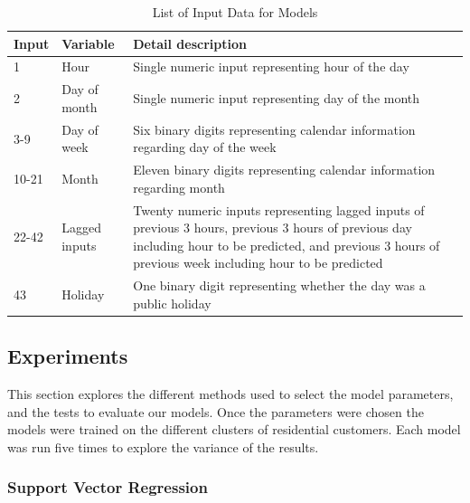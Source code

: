 \begin{table}
	\caption{List of Input Data for Models}
	\label{tab:feature}
	\begin{tabular}{p{1cm}p{1.8cm}p{4.8cm}}
		\toprule
		Input & Variable      & Detail description \\
		\midrule
		1     & Hour          & Single numeric input representing hour of the day                                                                                              \\
		2     & Day of month  & Single numeric input representing day of the month                                                                                             \\
		3-9   & Day of week   & Six binary digits representing calendar information regarding day of the week                                                                                            \\
		10-21 & Month         & Eleven binary digits representing calendar information regarding month                                                                                         \\
		22-42 & Lagged inputs & Twenty numeric inputs representing lagged inputs of previous 3 hours, previous 3 hours of previous day including hour to be predicted, and previous 3 hours of previous week including hour to be predicted \\
		43    & Holiday       & One binary digit representing whether the day was a public holiday  \\     \bottomrule                                                           
	\end{tabular}
\end{table}


\subsection{Experiments}

This section explores the different methods used to select the model parameters, and the tests to evaluate our models. Once the parameters were chosen the models were trained on the different clusters of residential customers. Each model was run five times to explore the variance of the results.  

\subsubsection{Support Vector Regression}

